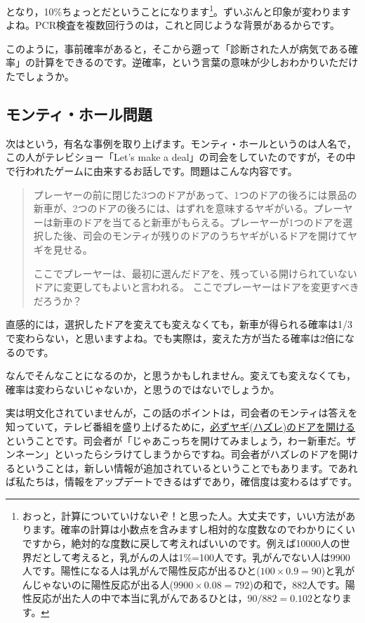 \documentclass{ltjbook}
\begin{document}
となり，10\%ちょっとだということになります\footnote{おっと，計算についていけないぞ！と思った人。大丈夫です，いい方法があります。確率の計算は小数点を含みますし相対的な度数なのでわかりにくいですから，絶対的な度数に戻して考えればいいのです。例えば10000人の世界だとして考えると，乳がんの人は1\%=100人です。乳がんでない人は9900人です。陽性になる人は乳がんで陽性反応が出るひと($100\times0.9=90$)と乳がんじゃないのに陽性反応が出る人($9900\times0.08=792$)の和で，882人です。陽性反応が出た人の中で本当に乳がんであるひとは，$90/882=0.102$となります。}。ずいぶんと印象が変わりますよね。PCR検査を複数回行うのは，これと同じような背景があるからです。

このように，事前確率があると，そこから遡って「診断された人が病気である確率」の計算をできるのです。逆確率，という言葉の意味が少しおわかりいただけたでしょうか。

\subsection{モンティ・ホール問題}

次はという，有名な事例を取り上げます。モンティ・ホールというのは人名で，この人がテレビショー「Let's make a deal」の司会をしていたのですが，その中で行われたゲームに由来するお話しです。問題はこんな内容です。

\begin{quotation}
プレーヤーの前に閉じた3つのドアがあって、1つのドアの後ろには景品の新車が、2つのドアの後ろには、はずれを意味するヤギがいる。プレーヤーは新車のドアを当てると新車がもらえる。プレーヤーが1つのドアを選択した後、司会のモンティが残りのドアのうちヤギがいるドアを開けてヤギを見せる。

ここでプレーヤーは、最初に選んだドアを、残っている開けられていないドアに変更してもよいと言われる。
ここでプレーヤーはドアを変更すべきだろうか？
\end{quotation}

直感的には，選択したドアを変えても変えなくても，新車が得られる確率は1/3で変わらない，と思いますよね。でも実際は，変えた方が当たる確率は2倍になるのです。

なんでそんなことになるのか，と思うかもしれません。変えても変えなくても，確率は変わらないじゃないか，と思うのではないでしょうか。

実は明文化されていませんが，この話のポイントは，司会者のモンティは答えを知っていて，テレビ番組を盛り上げるために，\underline{必ずヤギ(ハズレ)のドアを開ける}ということです。司会者が「じゃあこっちを開けてみましょう，わー新車だ。ザンネーン」といったらシラけてしまうからですね。司会者がハズレのドアを開けるということは，新しい情報が追加されているということでもあります。であれば私たちは，情報をアップデートできるはずであり，確信度は変わるはずです。
\end{document}
